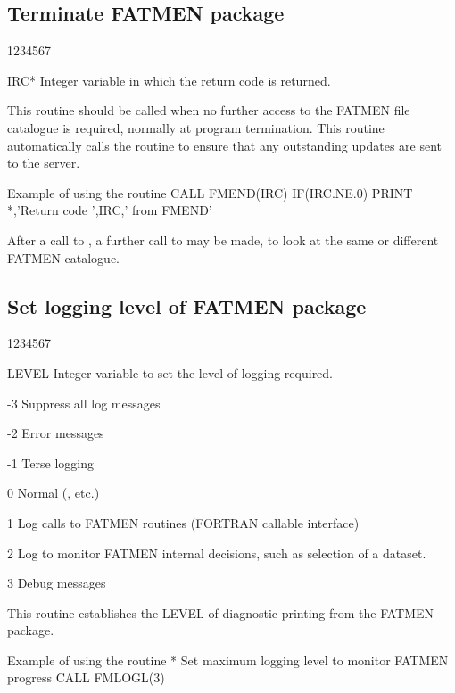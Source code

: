 \subsection{Terminate FATMEN package}
\begin{DLtt}{1234567}
\item[IRC*]
Integer variable in which the return code is returned.
\end{DLtt}
\par
This routine should be called when no further access to the FATMEN file
catalogue is required, normally at program termination.
This routine automatically calls the routine  to
ensure that any outstanding updates are sent to the server.
\begin{XMPt}{Example of using the routine \protect{}}
      CALL FMEND(IRC)
      IF(IRC.NE.0) PRINT *,'Return code ',IRC,' from FMEND'
\end{XMPt}
\par
After a call to , a further call to  may be made, to
look at the same or different FATMEN catalogue.
\subsection{Set logging level of FATMEN package}
\begin{DLtt}{1234567}
\item[LEVEL]
Integer variable to set the level of logging required.
\begin{DLtt}{12}
\item[-3]Suppress all log messages
\item[-2]Error messages
\item[-1]Terse logging
\item[0]Normal (,  etc.)
\item[1]Log calls to FATMEN routines (FORTRAN callable interface)
\item[2]Log to monitor FATMEN internal decisions, such as selection of a
dataset.
\item[3]Debug messages
\end{DLtt}
\end{DLtt}
\par
This routine establishes the LEVEL of diagnostic printing from the FATMEN
package. 
\begin{XMPt}{Example of using the routine }
*     Set maximum logging level to monitor FATMEN progress
      CALL FMLOGL(3)
\end{XMPt}
 

